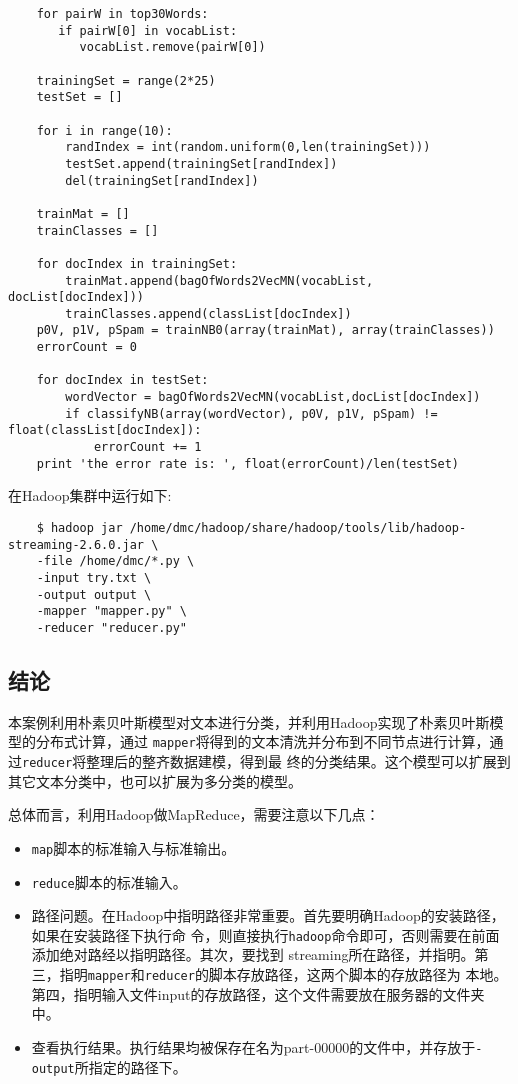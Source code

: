 \begin{lstlisting}
	for pairW in top30Words:
	   if pairW[0] in vocabList:
	      vocabList.remove(pairW[0])

	trainingSet = range(2*25)
	testSet = []

	for i in range(10):
	    randIndex = int(random.uniform(0,len(trainingSet)))
	    testSet.append(trainingSet[randIndex])
	    del(trainingSet[randIndex])

	trainMat = []
	trainClasses = []

	for docIndex in trainingSet:
	    trainMat.append(bagOfWords2VecMN(vocabList, docList[docIndex]))
	    trainClasses.append(classList[docIndex])
	p0V, p1V, pSpam = trainNB0(array(trainMat), array(trainClasses))
	errorCount = 0

	for docIndex in testSet:
	    wordVector = bagOfWords2VecMN(vocabList,docList[docIndex])
	    if classifyNB(array(wordVector), p0V, p1V, pSpam) != float(classList[docIndex]):
	        errorCount += 1
	print 'the error rate is: ', float(errorCount)/len(testSet)
\end{lstlisting}
在Hadoop集群中运行如下:

\begin{lstlisting}
	$ hadoop jar /home/dmc/hadoop/share/hadoop/tools/lib/hadoop-streaming-2.6.0.jar \
	-file /home/dmc/*.py \
	-input try.txt \
	-output output \
	-mapper "mapper.py" \
	-reducer "reducer.py"
\end{lstlisting}
\subsection{结论}\label{ux7ed3ux8bba}

本案例利用朴素贝叶斯模型对文本进行分类，并利用Hadoop实现了朴素贝叶斯模型的分布式计算，通过
\lstinline|mapper|将得到的文本清洗并分布到不同节点进行计算，通过\lstinline|reducer|将整理后的整齐数据建模，得到最
终的分类结果。这个模型可以扩展到其它文本分类中，也可以扩展为多分类的模型。

总体而言，利用Hadoop做MapReduce，需要注意以下几点：

\begin{itemize}
\item
  \lstinline|map|脚本的标准输入与标准输出。
\item
  \lstinline|reduce|脚本的标准输入。
\item
  路径问题。在Hadoop中指明路径非常重要。首先要明确Hadoop的安装路径，如果在安装路径下执行命
  令，则直接执行\texttt{hadoop}命令即可，否则需要在前面添加绝对路经以指明路径。其次，要找到
  streaming所在路径，并指明。第三，指明\lstinline|mapper|和\lstinline|reducer|的脚本存放路径，这两个脚本的存放路径为
  本地。第四，指明输入文件input的存放路径，这个文件需要放在服务器的文件夹中。
\item
  查看执行结果。执行结果均被保存在名为part-00000的文件中，并存放于\lstinline|-output|所指定的路径下。
\end{itemize}

